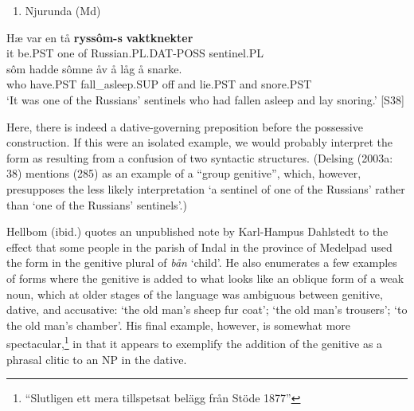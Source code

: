 \begin{enumerate} %
\item 
\label{bkm:Ref126396484}Njurunda (Md)

\end{enumerate} %
\ea\label{}
\gll Hæ  var  en  tå  \textbf{ryssôm-s}\textbf{  vaktknekter}\\


it  be.PST  one  of  Russian.PL.DAT-POSS  sentinel.PL\\ %


\ea\label{}
\gll sôm  hadde  sômne  åv  å  låg  å  snarke.\\


who  have.PST  fall\_asleep.SUP  off  and  lie.PST  and  snore.PST\\ %


 ‘It was one of the Russians’ sentinels who had fallen asleep and lay snoring.’ [S38]
\z

Here, there is indeed a dative-governing preposition before the possessive construction. If this were an isolated example, we would probably interpret the form  as resulting from a confusion of two syntactic structures. (Delsing (2003a: 38) mentions (285) as an example of a “group genitive”, which, however, presupposes the less likely interpretation ‘a sentinel of one of the Russians’ rather than ‘one of the Russians’ sentinels’.) 

Hellbom (ibid.) quotes an unpublished note by Karl-Hampus Dahlstedt to the effect that some people in the parish of Indal in the province of Medelpad used the form  in the genitive plural of \textit{bån} ‘child’. He also enumerates a few examples of forms where the genitive is added to what looks like an oblique form of a weak noun, which at older stages of the language was ambiguous between genitive, dative, and accusative:  ‘the old man’s sheep fur coat’;  ‘the old man’s trousers’;  ‘to the old man’s chamber’. His final example, however, is somewhat more spectacular,\footnote{ “Slutligen ett mera tillspetsat belägg från Stöde 1877”} in that it appears to exemplify the addition of the genitive as a phrasal clitic to an NP in the dative. 

